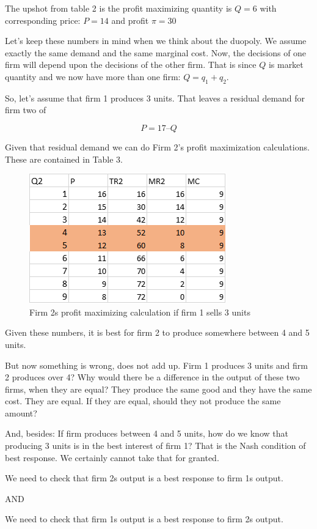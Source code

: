 \documentclass[
]{book}
\begin{document}
The upshot from table 2 is the profit maximizing quantity is \(Q = 6\) with corresponding price: \(P=14\) and profit \(\pi=30\)

Let's keep these numbers in mind when we think about the duopoly. We assume exactly the same demand and the same marginal cost. Now, the decisions of one firm will depend upon the decisions of the other firm. That is since \(Q\) is market quantity and we now have more than one firm: \(Q=q_1+q_2\).

So, let's assume that firm 1 produces 3 units. That leaves a residual demand for firm two of

\[P = 17 – Q\]

Given that residual demand we can do Firm 2's profit maximization calculations. These are contained in Table 3.

\begin{figure}

{\centering \includegraphics[width=0.5\linewidth]{img/ch8/fig3} 

}

\caption{Firm 2s profit maximizing calculation if firm 1 sells 3 units}\label{fig:fig803}
\end{figure}

Given these numbers, it is best for firm 2 to produce somewhere between 4 and 5 units.

But now something is wrong, does not add up. Firm 1 produces 3 units and firm 2 produces over 4? Why would there be a difference in the output of these two firms, when they are equal? They produce the same good and they have the same cost. They are equal. If they are equal, should they not produce the same amount?

And, besides: If firm produces between 4 and 5 units, how do we know that producing 3 units is in the best interest of firm 1? That is the Nash condition of best response. We certainly cannot take that for granted.

\begin{center}
We need to check that firm 2s output is a best response to firm 1s output.

AND

We need to check that firm 1s output is a best response to firm 2s output.

\end{center}
\end{document}
